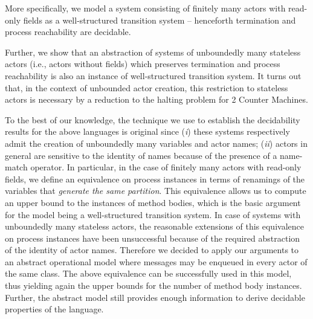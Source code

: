 \documentclass{LMCS}
\theoremstyle{plain}\newtheorem{proposition}[thm]{Proposition}
\theoremstyle{plain}\newtheorem{lemma}[thm]{Lemma}
\theoremstyle{plain}\newtheorem{theorem}[thm]{Theorem}
\theoremstyle{plain}\newtheorem{corollary}[thm]{Corollary}
\newif\ifconf \conffalse
\begin{document}
More specifically,  we model a system  consisting of finitely many actors with 
read-only fields as a  well-structured transition system \cite{Finkel:2001} -- 
henceforth \ifconf
termination.
\else
termination and process reachability are decidable.
\fi
Further, we show that an
abstraction of  systems of unboundedly many stateless actors 
(i.e., actors without fields) which preserves
termination and process reachability
is also an instance of well-structured transition system.
It turns out that, in the context of unbounded actor creation, 
this restriction to stateless actors is necessary by
a reduction to the halting problem for 2 Counter Machines.

To the best 
of our knowledge, the technique we use to establish the decidability results
for the above languages
is original since (\emph{i})  these systems respectively admit the creation of unboundedly many variables
 and actor names; (\emph{ii}) actors in general
are sensitive to the identity of names because of the presence of a name-match operator. 
In particular, in the case of finitely many actors with read-only fields,
we define an equivalence on process instances in terms of 
renamings of the variables that \emph{generate the same partition}.
This equivalence allows us to compute an upper bound to the
instances of method bodies, which is the basic argument for the model being a
well-structured transition system.
In case of systems with unboundedly many stateless actors, 
the reasonable extensions of this equivalence on process
instances have been unsuccessful because of the required abstraction of
the identity of actor names. Therefore we decided to apply our
arguments to an abstract operational model where messages
may be enqueued in every actor of the same class. The above equivalence can be  successfully used in this  model, thus yielding again the
upper bounds for the number of method body instances.  Further, the  abstract
model still provides enough information to derive
decidable properties of the language.
\end{document}
